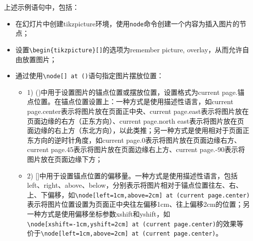上述示例语句中，包括：
\begin{itemize}
    \item 在幻灯片中创建tikzpicture环境，使用\texttt{node}命令创建一个内容为插入图片的节点；
    \item 设置\texttt{\textbackslash{}begin\{tikzpicture\}[]}的选项为remember picture, overlay，从而允许自由放置图片；
    \item 通过使用\texttt{\textbackslash{}node[] at ()}语句指定图片摆放位置：
          \begin{itemize}
              \item 1) ()中用于设置图片的锚点位置或摆放位置，设置格式为current page.锚点位置。在锚点位置设置上：一种方式是使用描述性语言，如current page.center表示将图片放在页面正中央、current page.east表示将图片放在页面边缘的右方（正东方向）、current page.north east表示将图片放在页面边缘的右上方（东北方向），以此类推；另一种方式是使用相对于页面正东方向的逆时针角度，如current page.0表示将图片放在页面边缘右方、current page.45表示将图片放在页面边缘右上方、current page.-90表示将图片放在页面边缘下方；
              \item 2) []中用于设置锚点位置的偏移量。一种方式是使用描述性语言，包括left、right、above、below，分别表示将图片相对于锚点位置往左、右、上、下偏移，如\texttt{\textbackslash{}node[left=1cm,above=2cm] at (current page.center)}表示将图片位置设置为页面正中央往左偏移1cm、往上偏移2cm的位置；另一种方式是使用偏移坐标参数xshift和yshift，如\texttt{\textbackslash{}node[xshift=-1cm,yshift=2cm] at (current page.center)}的效果等价于\texttt{\textbackslash{}node[left=1cm,above=2cm] at (current page.center)}。
          \end{itemize}
\end{itemize}

